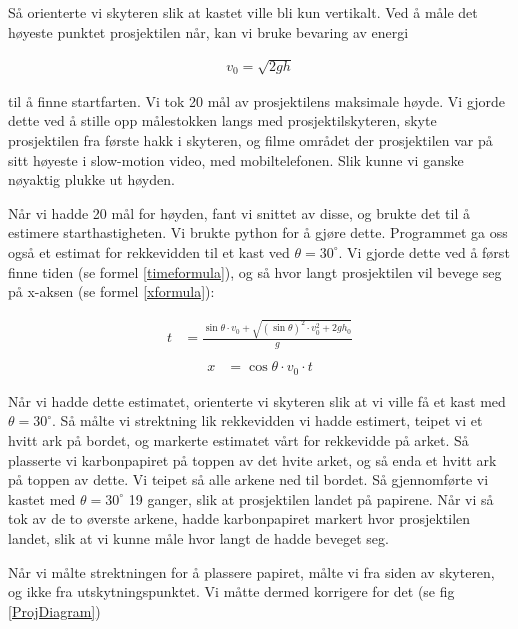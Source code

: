 \medskip

Så orienterte vi skyteren slik at kastet ville bli kun vertikalt. Ved å måle det høyeste punktet prosjektilen når, kan vi bruke bevaring av energi

\begin{align}
    v_0 = \sqrt{2gh}\label{energy}
\end{align}

til å finne startfarten. Vi tok 20 mål av prosjektilens maksimale høyde. Vi gjorde dette ved å stille opp målestokken langs med prosjektilskyteren, skyte prosjektilen fra første hakk i skyteren, og filme området der prosjektilen var på sitt høyeste i slow-motion video, med mobiltelefonen. Slik kunne vi ganske nøyaktig plukke ut høyden. \medskip

Når vi hadde 20 mål for høyden, fant vi snittet av disse, og brukte det til å estimere starthastigheten. Vi brukte python for å gjøre dette. Programmet ga oss også et estimat for rekkevidden til et kast ved $\theta = 30^\circ$. Vi gjorde dette ved å først finne tiden (se formel \ref{timeformula}), og så hvor langt prosjektilen vil bevege seg på x-aksen (se formel \ref{xformula}):

\begin{align}
    t &= \frac{\sin{\theta}\cdot v_0 + \sqrt{(\sin{\theta})^2\cdot v_0^2 + 2gh_0}}{g} \label{timeformula}\\
\end{align}
\begin{align}
    x &= \cos{\theta}\cdot v_0 \cdot t \label{xformula}
\end{align}

Når vi hadde dette estimatet, orienterte vi skyteren slik at vi ville få et kast med $\theta = 30^\circ$. Så målte vi strektning lik rekkevidden vi hadde estimert, teipet vi et hvitt ark på bordet, og markerte estimatet vårt for rekkevidde på arket. Så plasserte vi karbonpapiret på toppen av det hvite arket, og så enda et hvitt ark på toppen av dette. Vi teipet så alle arkene ned til bordet. Så gjennomførte vi kastet med $\theta = 30^\circ$ 19 ganger, slik at prosjektilen landet på papirene. Når vi så tok av de to øverste arkene, hadde karbonpapiret markert hvor prosjektilen landet, slik at vi kunne måle hvor langt de hadde beveget seg.\medskip

Når vi målte strektningen for å plassere papiret, målte vi fra siden av skyteren, og ikke fra utskytningspunktet. Vi måtte dermed korrigere for det (se fig \ref{ProjDiagram})

